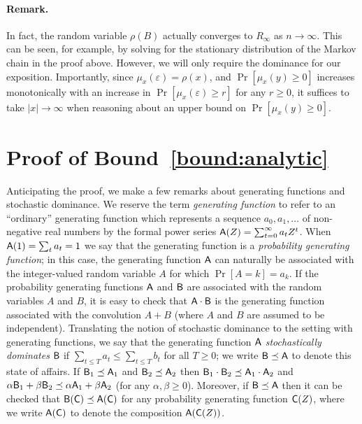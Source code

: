   \paragraph{Remark.} 
  In fact, the random variable $\rho(B)$
  actually converges to $R_\infty$ as $n \rightarrow \infty$. 
  This can be seen, for example, 
  by solving for the stationary distribution of the Markov chain in the proof above. 
  However, we will only require the dominance for our exposition. 
  Importantly, since $\mu_x(\varepsilon) = \rho(x)$, and 
  $\Pr[\mu_x(y) \geq 0]$ increases monotonically 
  with an increase in $\Pr[\mu_x(\varepsilon) \geq r]$ for any $r \geq 0$, 
  it suffices to take $|x| \rightarrow \infty$ 
  when reasoning about an upper bound on $\Pr[\mu_x(y) \geq 0]$. 

\section{Proof of Bound~\ref{bound:analytic}}\label{sec:gf-proof}

  Anticipating the proof, we make a few remarks about generating
  functions and stochastic dominance.  We reserve the term
  \emph{generating function} to refer to an ``ordinary'' generating
  function which represents a sequence $a_0, a_1, \ldots$ of
  non-negative real numbers by the formal power series
  $\mathsf{A}(Z) = \sum_{t = 0}^\infty a_t Z^t$. When
  $\mathsf{A}(1) = \sum_t a_t = 1$ we say that the generating function is
  a \emph{probability generating function}; in this case, the
  generating function $\mathsf{A}$ can naturally be associated with the
  integer-valued random variable $A$ for which $\Pr[A = k] = a_k$. If
  the probability generating functions $\mathsf{A}$ and $\mathsf{B}$ are
  associated with the random variables $A$ and $B$, it is easy to
  check that $\mathsf{A} \cdot \mathsf{B}$ is the generating function
  associated with the convolution $A + B$ (where $A$ and $B$ are
  assumed to be independent).  Translating the notion of stochastic
  dominance to the setting with generating functions, we say that the
  generating function $\mathsf{A}$ \emph{stochastically dominates}
  $\mathsf{B}$ if $\sum_{t \leq T} a_t \leq \sum_{t \leq T} b_t$ for all
  $T \geq 0$; we write $\mathsf{B} \preceq \mathsf{A}$ to denote this state of
  affairs. If $\mathsf{B}_1 \preceq \mathsf{A}_1$ and
  $\mathsf{B}_2 \preceq \mathsf{A}_2$ then
  $\mathsf{B}_1 \cdot \mathsf{B}_2 \preceq \mathsf{A}_1 \cdot \mathsf{A}_2$ and
  $\alpha \mathsf{B}_1 + \beta \mathsf{B}_2 \preceq \alpha \mathsf{A}_1 + \beta
  \mathsf{A}_2$ (for any $\alpha, \beta \geq 0$).  Moreover, if
  $\mathsf{B} \preceq \mathsf{A}$ then it can be checked that
  $\mathsf{B}(\mathsf{C}) \preceq \mathsf{A}(\mathsf{C})$ for any probability
  generating function $\mathsf{C}(Z)$, where we write $\mathsf{A}(\mathsf{C})$ to
  denote the composition $\mathsf{A}(\mathsf{C}(Z))$.


